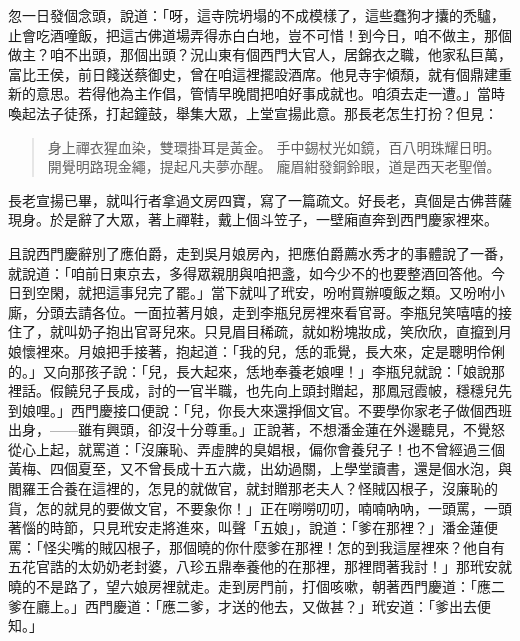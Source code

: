 忽一日發個念頭，說道：「呀，這寺院坍塌的不成模樣了，這些蠢狗才攮的禿驢，止會吃酒噇飯，把這古佛道場弄得赤白白地，豈不可惜！到今日，咱不做主，那個做主？咱不出頭，那個出頭？況山東有個西門大官人，居錦衣之職，他家私巨萬，富比王侯，前日餞送蔡御史，曾在咱這裡擺設酒席。他見寺宇傾頹，就有個鼎建重新的意思。若得他為主作倡，管情早晚間把咱好事成就也。咱須去走一遭。」當時喚起法子徒孫，打起鐘鼓，舉集大眾，上堂宣揚此意。那長老怎生打扮？但見：
\begin{quote}
身上禪衣猩血染，雙環掛耳是黃金。
手中錫杖光如鏡，百八明珠耀日明。
開覺明路現金繩，提起凡夫夢亦醒。
龐眉紺發銅鈴眼，道是西天老聖僧。
\end{quote}

長老宣揚已畢，就叫行者拿過文房四寶，寫了一篇疏文。好長老，真個是古佛菩薩現身。於是辭了大眾，著上禪鞋，戴上個斗笠子，一壁廂直奔到西門慶家裡來。

且說西門慶辭別了應伯爵，走到吳月娘房內，把應伯爵薦水秀才的事體說了一番，就說道：「咱前日東京去，多得眾親朋與咱把盞，如今少不的也要整酒回答他。今日到空閑，就把這事兒完了罷。」當下就叫了玳安，吩咐買辦嗄飯之類。又吩咐小廝，分頭去請各位。一面拉著月娘，走到李瓶兒房裡來看官哥。李瓶兒笑嘻嘻的接住了，就叫奶子抱出官哥兒來。只見眉目稀疏，就如粉塊妝成，笑欣欣，直攛到月娘懷裡來。月娘把手接著，抱起道：「我的兒，恁的乖覺，長大來，定是聰明伶俐的。」又向那孩子說：「兒，長大起來，恁地奉養老娘哩！」李瓶兒就說：「娘說那裡話。假饒兒子長成，討的一官半職，也先向上頭封贈起，那鳳冠霞帔，穩穩兒先到娘哩。」西門慶接口便說：「兒，你長大來還掙個文官。不要學你家老子做個西班出身，——雖有興頭，卻沒十分尊重。」正說著，不想潘金蓮在外邊聽見，不覺怒從心上起，就罵道：「沒廉恥、弄虛脾的臭娼根，偏你會養兒子！也不曾經過三個黃梅、四個夏至，又不曾長成十五六歲，出幼過關，上學堂讀書，還是個水泡，與閻羅王合養在這裡的，怎見的就做官，就封贈那老夫人？怪賊囚根子，沒廉恥的貨，怎的就見的要做文官，不要象你！」正在嘮嘮叨叨，喃喃吶吶，一頭罵，一頭著惱的時節，只見玳安走將進來，叫聲「五娘」，說道：「爹在那裡？」潘金蓮便罵：「怪尖嘴的賊囚根子，那個曉的你什麼爹在那裡！怎的到我這屋裡來？他自有五花官誥的太奶奶老封婆，八珍五鼎奉養他的在那裡，那裡問著我討！」那玳安就曉的不是路了，望六娘房裡就走。走到房門前，打個咳嗽，朝著西門慶道：「應二爹在廳上。」西門慶道：「應二爹，才送的他去，又做甚？」玳安道：「爹出去便知。」

